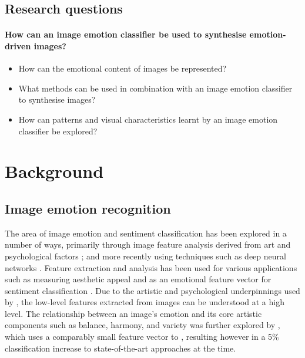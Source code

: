 \documentclass{article}
\begin{document}
\subsection{Research questions}

\paragraph{How can an image emotion classifier be used to synthesise emotion-driven images?}
\begin{itemize}
	\item How can the emotional content of images be represented?
	\item What methods can be used in combination with an image emotion classifier to synthesise images?
	\item How can patterns and visual characteristics learnt by an image emotion classifier be explored?
\end{itemize}


\section{Background}

\subsection{Image emotion recognition}

The area of image emotion and sentiment classification has been explored in a number of ways, primarily through image feature analysis derived from art and psychological factors \citep{machajdik2010affective}; and more recently using techniques such as deep neural networks \citep{chen2015learning, kim2018building}.
Feature extraction and analysis has been used for various applications such as measuring aesthetic appeal \citep{den2010using,den2010comparing,den2011evolving} and as an emotional feature vector for sentiment classification \citep{machajdik2010affective}.
Due to the artistic and psychological underpinnings used by \citet{machajdik2010affective}, the low-level features extracted from images can be understood at a high level.
The relationship between an image's emotion and its core artistic components such as balance, harmony, and variety was further explored by \citet{zhao2014exploring}, which uses a comparably small feature vector to \citet{machajdik2010affective}, resulting however in a 5\% classification increase to state-of-the-art approaches at the time.
\end{document}
